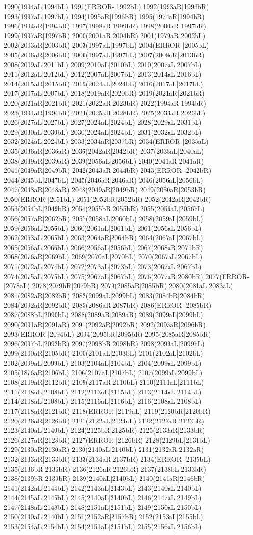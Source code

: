 1990(1994aL|1994bL) 1991(ERROR-|1992bL) 1992(1993aR|1993bR) 1993(1997aL|1997bL) 1994(1995aR|1996bR) 1995(1974aR|1994bR) 1996(1994aR|1994bR) 1997(1998aR|1999bR) 1998(2000aR|1997bR) 1999(1997aR|1997bR) 2000(2001aR|2004bR) 2001(1979aR|2002bL) 2002(2003aR|2003bR) 2003(1997aL|1997bL) 2004(ERROR-|2005bL) 2005(2006aR|2006bR) 2006(1997aL|1997bL) 2007(2008aR|2013bR) 2008(2009aL|2011bL) 2009(2010aL|2010bL) 2010(2007aL|2007bL) 2011(2012aL|2012bL) 2012(2007aL|2007bL) 2013(2014aL|2016bL) 2014(2015aR|2015bR) 2015(2024aL|2024bL) 2016(2017aL|2017bL) 2017(2007aL|2007bL) 2018(2019aR|2020bR) 2019(2021aR|2021bR) 2020(2021aR|2021bR) 2021(2022aR|2023bR) 2022(1994aR|1994bR) 2023(1994aR|1994bR) 2024(2025aR|2028bR) 2025(2033aR|2026bL) 2026(2027aL|2027bL) 2027(2024aL|2024bL) 2028(2029aL|2031bL) 2029(2030aL|2030bL) 2030(2024aL|2024bL) 2031(2032aL|2032bL) 2032(2024aL|2024bL) 2033(2034aR|2037bR) 2034(ERROR-|2035aL) 2035(2036aR|2036aR) 2036(2042aR|2042bR) 2037(2038aL|2040aL) 2038(2039aR|2039aR) 2039(2056aL|2056bL) 2040(2041aR|2041aR) 2041(2049aR|2049bR) 2042(2043aR|2044bR) 2043(ERROR-|2042bR) 2044(2045bL|2047bL) 2045(2046aR|2046aR) 2046(2056aL|2056bL) 2047(2048aR|2048aR) 2048(2049aR|2049bR) 2049(2050aR|2053bR) 2050(ERROR-|2051bL) 2051(2052bR|2052bR) 2052(2042aR|2042bR) 2053(2054bL|2049bR) 2054(2055bR|2055bR) 2055(2056aL|2056bL) 2056(2057aR|2062bR) 2057(2058aL|2060bL) 2058(2059aL|2059bL) 2059(2056aL|2056bL) 2060(2061aL|2061bL) 2061(2056aL|2056bL) 2062(2063aL|2065bL) 2063(2064aR|2064bR) 2064(2067aL|2067bL) 2065(2066aL|2066bL) 2066(2056aL|2056bL) 2067(2068aR|2071bR) 2068(2076aR|2069bL) 2069(2070aL|2070bL) 2070(2067aL|2067bL) 2071(2072aL|2074bL) 2072(2073aL|2073bL) 2073(2067aL|2067bL) 2074(2075aL|2075bL) 2075(2067aL|2067bL) 2076(2077aR|2080bR) 2077(ERROR-|2078aL) 2078(2079bR|2079bR) 2079(2085aR|2085bR) 2080(2081aL|2083aL) 2081(2082aR|2082bR) 2082(2099aL|2099bL) 2083(2084bR|2084bR) 2084(2092aR|2092bR) 2085(2086aR|2087bR) 2086(ERROR-|2085bR) 2087(2088bL|2090bL) 2088(2089aR|2089aR) 2089(2099aL|2099bL) 2090(2091aR|2091aR) 2091(2092aR|2092bR) 2092(2093aR|2096bR) 2093(ERROR-|2094bL) 2094(2095bR|2095bR) 2095(2085aR|2085bR) 2096(2097bL|2092bR) 2097(2098bR|2098bR) 2098(2099aL|2099bL) 2099(2100aR|2105bR) 2100(2101aL|2103bL) 2101(2102aL|2102bL) 2102(2099aL|2099bL) 2103(2104aL|2104bL) 2104(2099aL|2099bL) 2105(1876aR|2106bL) 2106(2107aL|2107bL) 2107(2099aL|2099bL) 2108(2109aR|2112bR) 2109(2117aR|2110bL) 2110(2111aL|2111bL) 2111(2108aL|2108bL) 2112(2113aL|2115bL) 2113(2114aL|2114bL) 2114(2108aL|2108bL) 2115(2116aL|2116bL) 2116(2108aL|2108bL) 2117(2118aR|2121bR) 2118(ERROR-|2119aL) 2119(2120bR|2120bR) 2120(2126aR|2126bR) 2121(2122aL|2124aL) 2122(2123aR|2123bR) 2123(2140aL|2140bL) 2124(2125bR|2125bR) 2125(2133aR|2133bR) 2126(2127aR|2128bR) 2127(ERROR-|2126bR) 2128(2129bL|2131bL) 2129(2130aR|2130aR) 2130(2140aL|2140bL) 2131(2132aR|2132aR) 2132(2133aR|2133bR) 2133(2134aR|2137bR) 2134(ERROR-|2135bL) 2135(2136bR|2136bR) 2136(2126aR|2126bR) 2137(2138bL|2133bR) 2138(2139bR|2139bR) 2139(2140aL|2140bL) 2140(2141aR|2146bR) 2141(2142aL|2144bL) 2142(2143aL|2143bL) 2143(2140aL|2140bL) 2144(2145aL|2145bL) 2145(2140aL|2140bL) 2146(2147aL|2149bL) 2147(2148aL|2148bL) 2148(2151aL|2151bL) 2149(2150aL|2150bL) 2150(2140aL|2140bL) 2151(2152aR|2157bR) 2152(2153aL|2155bL) 2153(2154aL|2154bL) 2154(2151aL|2151bL) 2155(2156aL|2156bL) 